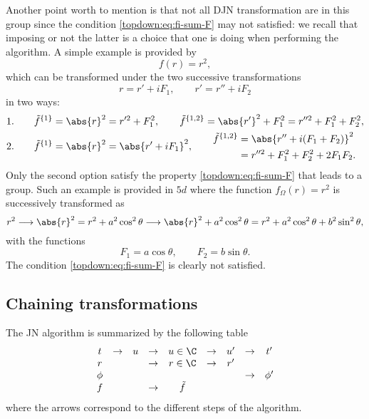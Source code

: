 Another point worth to mention is that not all DJN transformation are in this group since the condition \eqref{topdown:eq:fi-sum-F} may not satisfied: we recall that imposing or not the latter is a choice that one is doing when performing the algorithm.
A simple example is provided by
\begin{equation}
	f(r) = r^2,
\end{equation} 
which can be transformed under the two successive transformations
\begin{equation}
	r = r' + i F_1, \qquad
	r' = r'' + i F_2
\end{equation} 
in two ways:
\begin{subequations}
\begin{align}
	1.& \qquad
		\tilde f^{\{1\}} = \abs{r}^2
			= r'^2 + F_1^2, \qquad
		\tilde f^{\{1,2\}} = \abs{r'}^2 + F_1^2
			= r''^2 + F_1^2 + F_2^2, \\
	2.& \qquad
		\tilde f^{\{1\}} = \abs{r}^2
			= \abs{r' + i F_1}^2, \qquad
		\begin{aligned}
			\tilde f^{\{1,2\}} &= \abs{r'' + i (F_1 + F_2)}^2 \\
				&= r''^2 + F_1^2 + F_2^2 + 2 F_1 F_2.
		\end{aligned}
\end{align}
\end{subequations}
Only the second option satisfy the property \eqref{topdown:eq:fi-sum-F} that leads to a group.
Such an example is provided in $5d$ where the function $f_\Omega(r) = r^2$ is successively transformed as~\cite{Erbin:2015:FivedimensionalJanisNewmanAlgorithm}
\begin{equation}
	r^2 \longrightarrow \abs{r}^2 = r^2 + a^2 \cos^2 \theta \longrightarrow \abs{r}^2 + a^2 \cos^2 \theta = r^2 + a^2 \cos^2 \theta + b^2 \sin^2 \theta,
\end{equation} 
with the functions
\begin{equation}
	F_1 = a \cos \theta, \qquad
	F_2 = b \sin \theta.
\end{equation} 
The condition \eqref{topdown:eq:fi-sum-F} is clearly not satisfied.


\subsection{Chaining transformations}
\label{sec:jna-prop:chaining}



The JN algorithm is summarized by the following table
\begin{equation}
	\begin{array}{cccccccccc}
 		t             & \to & u & \to & u \in \C    & \to & u' & \to & t'    \\
		r             &     &   & \to & r \in \C    & \to & r' &     &      \\
		\phi          &     &   &     &             &     &    & \to & \phi' \\
		f             &     &   & \to & \tilde f    &     &    &     &
	\end{array}
\end{equation}
where the arrows correspond to the different steps of the algorithm.

